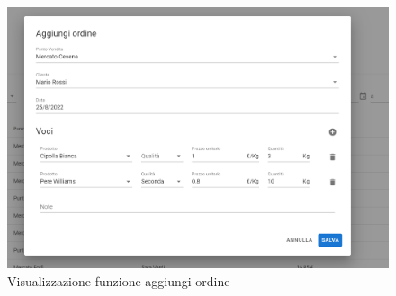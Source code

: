 \documentclass[italian]{report}
\begin{document}
\begin{figure}[htp]
    \centering
    \includegraphics[width=\textwidth]{assets/final_add_order.png}
    \caption{Visualizzazione funzione aggiungi ordine}
    \label{fig:addOrderForm}
\end{figure}
\end{document}
